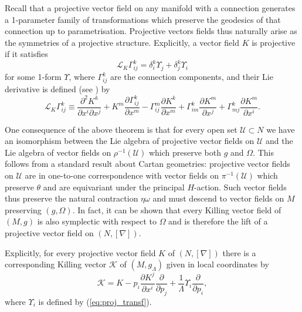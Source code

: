 Recall that a projective vector field on any manifold with a connection
generates a 1-parameter family of transformations which preserve the
geodesics of that connection up to parametrisation. Projective vectors
fields thus naturally arise as the symmetries of a projective structure.
Explicitly, a vector field $K$ is projective if it satisfies
\begin{equation}
\mathcal{L}_{K}\Gamma_{ij}^{k}=\delta_{i}^{k}\Upsilon_{j}+\delta_{j}^{k}\Upsilon_{i}\label{eq:proj_transf}
\end{equation}
for some 1-form $\Upsilon$, where $\Gamma_{ij}^{k}$ are the connection
components, and their Lie derivative is defined (see \cite{Yano1955})
by
\begin{equation}
\mathcal{L}_{K}\Gamma_{ij}^{k}\equiv\frac{\partial^{2}K^{k}}{\partial x^{i}\partial x^{j}}+K^{m}\frac{\partial\Gamma_{ij}^{k}}{\partial x^{m}}-\Gamma_{ij}^{m}\frac{\partial K^{k}}{\partial x^{m}}+\Gamma_{im}^{k}\frac{\partial K^{m}}{\partial x^{j}}+\Gamma_{mj}^{k}\frac{\partial K^{m}}{\partial x^{i}}.\label{eq:liederivGamma}
\end{equation}


One consequence of the above theorem is that for every open set $\mathcal{U}\subset N$
we have an isomorphism between the Lie algebra of projective vector
fields on $\mathcal{U}$ and the Lie algebra of vector fields on $\rho^{-1}(\mathcal{U})$
which preserve both $g$ and $\Omega$. This follows from a standard
result about Cartan geometries: projective vector fields on $\mathcal{U}$
are in one-to-one correspondence with vector fields on $\pi^{-1}(\mathcal{U})$
which preserve $\theta$ and are equivariant under the principal $H$-action.
Such vector fields thus preserve the natural contraction $\eta\omega$
and must descend to vector fields on $M$ preserving $(g,\Omega)$.
In fact, it can be shown that every Killing vector field of $(M,g)$
is also symplectic with respect to $\Omega$ and is therefore the
lift of a projective vector field on $(N,[\nabla])$.

Explicitly, for every projective vector field $K$ of $(N,[\nabla])$
there is a corresponding Killing vector $\mathcal{K}$ of $(M,g_{\Lambda})$
given in local coordinates by 
\begin{equation}
\mathcal{K}=K-p_{i}\frac{\partial K^{j}}{\partial x^{i}}\frac{\partial}{\partial p_{j}}+\frac{1}{\Lambda}\Upsilon_{i}\frac{\partial}{\partial p_{i}},\label{eq:kvf_from_pvf}
\end{equation}
where $\Upsilon_{i}$ is defined by (\ref{eq:proj_transf}).

